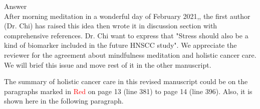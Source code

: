\documentclass[preprint,12pt]{elsarticle}
\newenvironment{MyColorPar}[1]{%
    \leavevmode\color{#1}\ignorespaces%
}{%
}%
\begin{document}

\begin{MyColorPar}{blue}
Answer\\
After morning meditation in a wonderful day of February 2021,, the first author (Dr. Chi) has raised this idea then wrote it in discussion section with comprehensive references. Dr. Chi want to express that "Stress should also be a kind of biomarker included in the future HNSCC study".
We appreciate the reviewer for the agreement about mindfulness meditation and holistic cancer care. We will brief this issue and move rest of it in the other manuscript.

The summary of holistic cancer care in this revised manuscript could be on the paragraphs marked in \textcolor{red}{Red} on page 13 (line 381) to page 14 (line 396).
Also, it is shown here in the following paragraph.



\end{MyColorPar}
\end{document}
